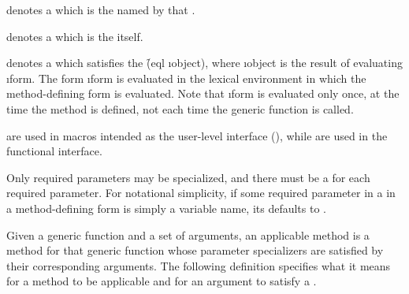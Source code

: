 \beginlist


denotes a  which is the  
named by that .


denotes a  which is the  itself.


denotes a  which satisfies the 
\f{(eql \i{object})}, where \i{object} is the 
result of evaluating \i{form}.  The form \i{form} is evaluated in 
the lexical environment in which the method-defining form is evaluated.
Note that \i{form} is evaluated only once, at the time the method is
defined, not each time the generic function is called.
\endlist

 are used in macros intended as the
user-level interface (), while 
are used in the functional interface.

Only required parameters may be specialized, and there must be a
 for each required parameter.  For notational
simplicity, if some required parameter in a  in
a method-defining form is simply a variable name, its 
 defaults to .

Given a generic function and a set of arguments, an applicable
method is a method for that generic function whose parameter
specializers are satisfied by their corresponding arguments.  The
following definition specifies what it means for a method to be
applicable and for an argument to satisfy a .


